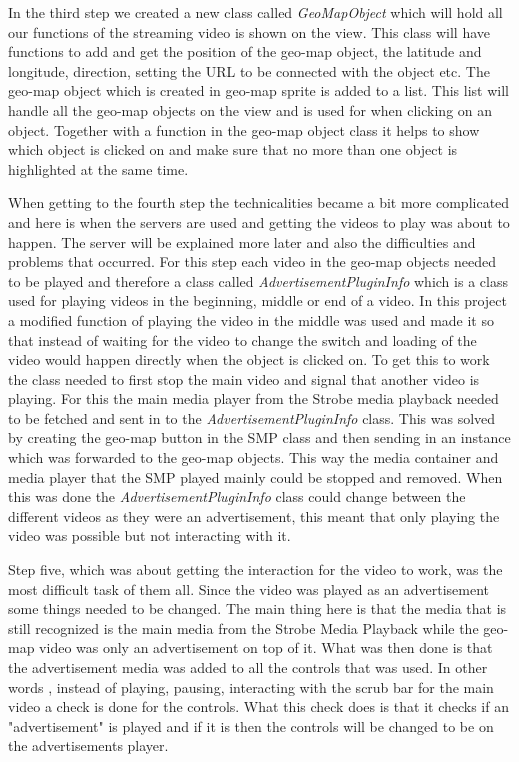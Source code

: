 In the third step we created a new class called \textit{GeoMapObject} which will hold all our functions of the streaming video is shown on the view. This class will have functions to add and get the position of the geo-map object, the latitude and longitude, direction, setting the URL to be connected with the object etc. The geo-map object which is created in geo-map sprite is added to a list. This list will handle all the geo-map objects on the view and is used for when clicking on an object. Together with a function in the geo-map object class it helps to show which object is clicked on and make sure that no more than one object is highlighted at the same time.

When getting to the fourth step the technicalities became a bit more complicated and here is when the servers are used and getting the videos to play was about to happen. The server will be explained more later and also the difficulties and problems that occurred. For this step each video in the geo-map objects needed to be played and therefore a class called   \textit{AdvertisementPluginInfo} which is a class used for playing videos in the beginning, middle or end of a video. In this project a modified function of playing the video in the middle was used and made it so that instead of waiting for the video to change the switch and loading of the video would happen directly when the object is clicked on. To get this to work the class needed to first stop the main video and signal that another video is playing. For this the main media player from the Strobe media playback needed to be fetched and sent in to the \textit{AdvertisementPluginInfo} class. This was solved by creating the geo-map button in the SMP class and then sending in an instance which was forwarded to the geo-map objects. This way the media container and media player that the SMP played mainly could be stopped and removed. When this was done the \textit{AdvertisementPluginInfo} class could change between the different videos as they were an advertisement, this meant that only playing the video was possible but not interacting with it.

Step five, which was about getting the interaction for the video to work, was the most difficult task of them all. Since the video was played as an advertisement some things needed to be changed. The main thing here is that the media that is still recognized is the main media from the Strobe Media Playback while the geo-map video was only an advertisement on top of it. What was then done is that the advertisement media was added to all the controls that was used. In other words , instead of playing, pausing, interacting with the scrub bar for the main video a check is done for the controls. What this check does is that it checks if an "advertisement" is played and if it is then the controls will be changed to be on the advertisements player.

